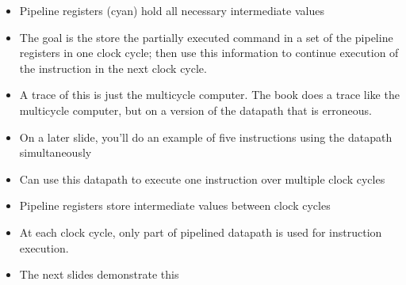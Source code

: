 \begin{frame}[fragile]
\begin{itemize}
\item Pipeline registers (cyan) hold all necessary intermediate values
\end{itemize}
\BNotes\ifnum{}
\begin{itemize}
\item The goal is the store the partially executed command in a set of the
  pipeline registers in one clock cycle; then use this information to
  continue execution of the instruction in the next clock cycle.

\item A trace of this is just the multicycle computer.
  The book does a trace like the multicycle computer, but on a version of the datapath that is erroneous.
\item On a later slide, you'll do an example of five instructions using the datapath simultaneously
\end{itemize}
\fi\ENotes
\end{frame}









\iftrue
\begin{frame}[fragile]
	\begin{itemize}
		\item Can use this datapath to execute one instruction			over multiple clock cycles
		\item Pipeline registers store intermediate values between
			clock cycles
		\item At each clock cycle, only part of pipelined datapath is used for instruction execution.
	\end{itemize}
\BNotes\ifnum{}
\begin{itemize}
  \item The next slides demonstrate this
\end{itemize}
\fi\ENotes
\end{frame}



